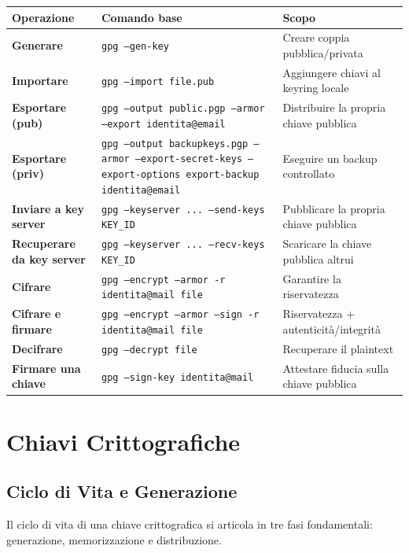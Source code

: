 \documentclass[12pt, a4paper]{report}
\begin{document}
\begin{table}[H]
	\centering
	\begin{tabular}{|p{3cm}|p{7cm}|p{4.5cm}|}
		\hline
		\textbf{Operazione} & \textbf{Comando base} & \textbf{Scopo} \\ \hline
		\textbf{Generare} & \texttt{gpg --gen-key} & Creare coppia pubblica/privata \\ \hline
		\textbf{Importare} & \texttt{gpg --import file.pub} & Aggiungere chiavi al keyring locale \\ \hline
		\textbf{Esportare (pub)} & \texttt{gpg --output public.pgp --armor --export identita@email} & Distribuire la propria chiave pubblica \\ \hline
		\textbf{Esportare (priv)} & \texttt{gpg --output backupkeys.pgp --armor --export-secret-keys --export-options export-backup identita@email} & Eseguire un backup controllato \\ \hline
		\textbf{Inviare a key server} & \texttt{gpg --keyserver ... --send-keys KEY\_ID} & Pubblicare la propria chiave pubblica \\ \hline
		\textbf{Recuperare da key server} & \texttt{gpg --keyserver ... --recv-keys KEY\_ID} & Scaricare la chiave pubblica altrui \\ \hline
		\textbf{Cifrare} & \texttt{gpg --encrypt --armor -r identita@mail file} & Garantire la riservatezza \\ \hline
		\textbf{Cifrare e firmare} & \texttt{gpg --encrypt --armor --sign -r identita@mail file} & Riservatezza + autenticità/integrità \\ \hline
		\textbf{Decifrare} & \texttt{gpg --decrypt file} & Recuperare il plaintext \\ \hline
		\textbf{Firmare una chiave} & \texttt{gpg --sign-key identita@mail} & Attestare fiducia sulla chiave pubblica \\ \hline
	\end{tabular}
\end{table}

\chapter{Chiavi Crittografiche}

\section{Ciclo di Vita e Generazione}
Il ciclo di vita di una chiave crittografica si articola in tre fasi fondamentali: generazione, memorizzazione e distribuzione.
\end{document}
